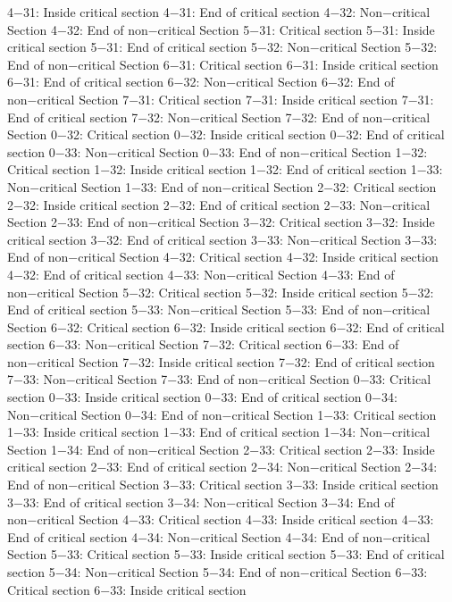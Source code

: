4−31: Inside critical section
4−31: End of critical section
4−32: Non−critical Section
4−32: End of non−critical Section
5−31: Critical section
5−31: Inside critical section
5−31: End of critical section
5−32: Non−critical Section
5−32: End of non−critical Section
6−31: Critical section
6−31: Inside critical section
6−31: End of critical section
6−32: Non−critical Section
6−32: End of non−critical Section
7−31: Critical section
7−31: Inside critical section
7−31: End of critical section
7−32: Non−critical Section
7−32: End of non−critical Section
0−32: Critical section
0−32: Inside critical section
0−32: End of critical section
0−33: Non−critical Section
0−33: End of non−critical Section
1−32: Critical section
1−32: Inside critical section
1−32: End of critical section
1−33: Non−critical Section
1−33: End of non−critical Section
2−32: Critical section
2−32: Inside critical section
2−32: End of critical section
2−33: Non−critical Section
2−33: End of non−critical Section
3−32: Critical section
3−32: Inside critical section
3−32: End of critical section
3−33: Non−critical Section
3−33: End of non−critical Section
4−32: Critical section
4−32: Inside critical section
4−32: End of critical section
4−33: Non−critical Section
4−33: End of non−critical Section
5−32: Critical section
5−32: Inside critical section
5−32: End of critical section
5−33: Non−critical Section
5−33: End of non−critical Section
6−32: Critical section
6−32: Inside critical section
6−32: End of critical section
6−33: Non−critical Section
7−32: Critical section
6−33: End of non−critical Section
7−32: Inside critical section
7−32: End of critical section
7−33: Non−critical Section
7−33: End of non−critical Section
0−33: Critical section
0−33: Inside critical section
0−33: End of critical section
0−34: Non−critical Section
0−34: End of non−critical Section
1−33: Critical section
1−33: Inside critical section
1−33: End of critical section
1−34: Non−critical Section
1−34: End of non−critical Section
2−33: Critical section
2−33: Inside critical section
2−33: End of critical section
2−34: Non−critical Section
2−34: End of non−critical Section
3−33: Critical section
3−33: Inside critical section
3−33: End of critical section
3−34: Non−critical Section
3−34: End of non−critical Section
4−33: Critical section
4−33: Inside critical section
4−33: End of critical section
4−34: Non−critical Section
4−34: End of non−critical Section
5−33: Critical section
5−33: Inside critical section
5−33: End of critical section
5−34: Non−critical Section
5−34: End of non−critical Section
6−33: Critical section
6−33: Inside critical section
